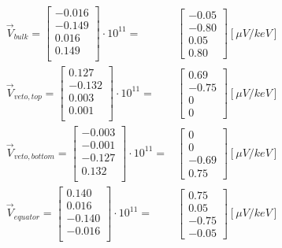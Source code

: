 \begin{align}
\vec{V}_{bulk}
=
\begin{bmatrix}
  -0.016 \\ -0.149 \\ 0.016 \\ 0.149\\
\end{bmatrix}
\cdot 10^{11}
= &
\begin{bmatrix}
-0.05 \\ -0.80 \\ 0.05 \\ 0.80
\end{bmatrix}
[\mu V/keV]
\\
\vec{V}_{veto,top}
=
\begin{bmatrix}
  0.127 \\ -0.132 \\ 0.003 \\ 0.001\\
\end{bmatrix}
\cdot 10^{11}
= &
\begin{bmatrix}
0.69 \\ -0.75 \\ 0 \\ 0
\end{bmatrix}
[\mu V/keV]
\\
\vec{V}_{veto,bottom}
=
\begin{bmatrix}
  -0.003 \\ -0.001 \\ -0.127 \\ 0.132\\
\end{bmatrix}
\cdot 10^{11}
= &
\begin{bmatrix}
0 \\ 0 \\ -0.69 \\ 0.75
\end{bmatrix}
[\mu V/keV]
\\
\vec{V}_{equator}
=
\begin{bmatrix}
  0.140 \\ 0.016 \\ -0.140 \\ -0.016\\
\end{bmatrix}
\cdot 10^{11}
= &
\begin{bmatrix}
0.75 \\ 0.05 \\ -0.75 \\ -0.05
\end{bmatrix}
[\mu V/keV]
\end{align}


